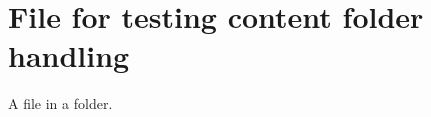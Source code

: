 
\chapter{\label{file-for-testing-content-folder-handling}File for testing content folder handling}
\par A file in a folder. 